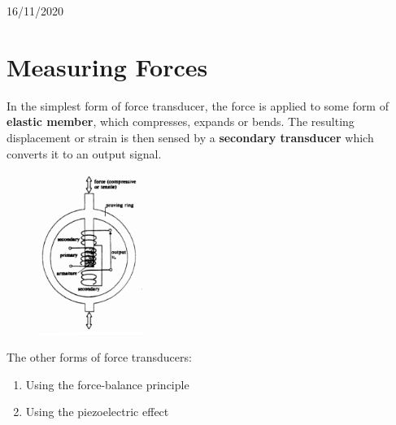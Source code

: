 \documentclass[class=report, crop=false, 12pt,a4paper]{standalone}
\begin{document}
\begin{center}
  16/11/2020
\end{center}
\section{Measuring Forces}
In the simplest form of force transducer, the force is applied to some form of \textbf{elastic member}, which compresses, expands or bends. The resulting displacement or strain is then sensed by a \textbf{secondary transducer} which converts it to an output signal.
\begin{figure}[H]
  \centering
  \includegraphics[width = 0.3\textwidth]{../img/Mdiagram22.png}
\end{figure}
The other forms of force transducers:
\begin{enumerate}
  \item Using the force-balance principle
  \item Using the piezoelectric effect
\end{enumerate}
\end{document}
